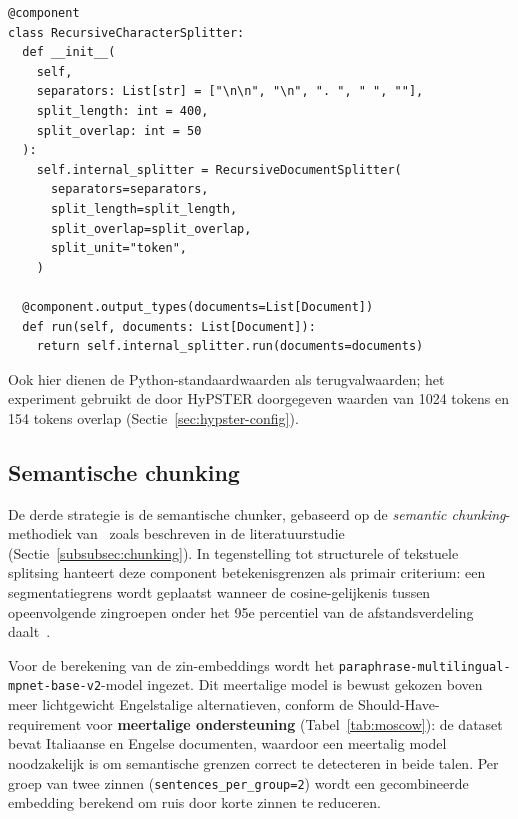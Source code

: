 \begin{listing}[H]
\begin{verbatim}
@component
class RecursiveCharacterSplitter:
  def __init__(
    self,
    separators: List[str] = ["\n\n", "\n", ". ", " ", ""],
    split_length: int = 400,
    split_overlap: int = 50
  ):
    self.internal_splitter = RecursiveDocumentSplitter(
      separators=separators,
      split_length=split_length,
      split_overlap=split_overlap,
      split_unit="token",
    )

  @component.output_types(documents=List[Document])
  def run(self, documents: List[Document]):
    return self.internal_splitter.run(documents=documents)
\end{verbatim}
\caption[RecursiveCharacterSplitter: hiërarchische splitsing op structurele grenzen]{Identieke tokenparameters als de fixed-size chunker (1024 tokens, overlap 154) maar met een volledige scheidingsteken-hiërarchie die alinea- en zinsgrenzen respecteert. De gecontroleerde parameteridentiteit maakt een directe prestatievergelijking van de splitsingstrategie mogelijk.}
\label{lst:recursive-chunker}
\end{listing}

Ook hier dienen de Python-standaardwaarden als terugvalwaarden; het experiment gebruikt de door HyPSTER doorgegeven waarden van 1024 tokens en 154 tokens overlap (Sectie~\ref{sec:hypster-config}).

\subsection{Semantische chunking}
\label{subsec:semantic-chunker}

De derde strategie is de semantische chunker, gebaseerd op de \emph{semantic chunking}-methodiek van~\textcite{Kamradt2023} zoals beschreven in de literatuurstudie (Sectie~\ref{subsubsec:chunking}). In tegenstelling tot structurele of tekstuele splitsing hanteert deze component betekenisgrenzen als primair criterium: een segmentatiegrens wordt geplaatst wanneer de cosine-gelijkenis tussen opeenvolgende zingroepen onder het 95e percentiel van de afstandsverdeling daalt~\autocite{Kamradt2023}.

Voor de berekening van de zin-embeddings wordt het \texttt{paraphrase-multilingual-mpnet-base-v2}-model ingezet. Dit meertalige model is bewust gekozen boven meer lichtgewicht Engelstalige alternatieven, conform de Should-Have-requirement voor \textbf{meertalige ondersteuning} (Tabel~\ref{tab:moscow}): de dataset bevat Italiaanse en Engelse documenten, waardoor een meertalig model noodzakelijk is om semantische grenzen correct te detecteren in beide talen. Per groep van twee zinnen (\texttt{sentences\_per\_group=2}) wordt een gecombineerde embedding berekend om ruis door korte zinnen te reduceren.

